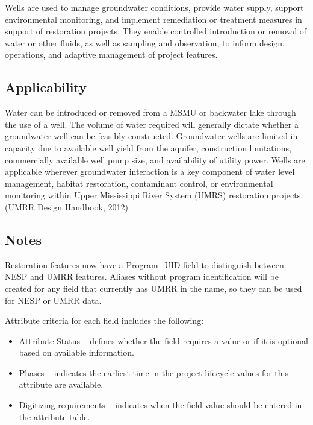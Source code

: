 \documentclass[
  letterpaper,
  DIV=11,
  numbers=noendperiod]{scrreprt}
\providecommand{\tightlist}{%
  \setlength{\itemsep}{0pt}\setlength{\parskip}{0pt}}
\begin{document}
Wells are used to manage groundwater conditions, provide water supply,
support environmental monitoring, and implement remediation or treatment
measures in support of restoration projects. They enable controlled
introduction or removal of water or other fluids, as well as sampling
and observation, to inform design, operations, and adaptive management
of project features.

\subsection{Applicability}\label{applicability-15}

Water can be introduced or removed from a MSMU or backwater lake through
the use of a well. The volume of water required will generally dictate
whether a groundwater well can be feasibly constructed. Groundwater
wells are limited in capacity due to available well yield from the
aquifer, construction limitations, commercially available well pump
size, and availability of utility power. Wells are applicable wherever
groundwater interaction is a key component of water level management,
habitat restoration, contaminant control, or environmental monitoring
within Upper Mississippi River System (UMRS) restoration projects. (UMRR
Design Handbook, 2012)

\subsection{Notes}\label{notes-17}

Restoration features now have a Program\_UID field to distinguish
between NESP and UMRR features. Aliases without program identification
will be created for any field that currently has UMRR in the name, so
they can be used for NESP or UMRR data.

Attribute criteria for each field includes the following:

\begin{itemize}
\tightlist
\item
  Attribute Status -- defines whether the field requires a value or if
  it is optional based on available information.
\item
  Phases -- indicates the earliest time in the project lifecycle values
  for this attribute are available.
\item
  Digitizing requirements -- indicates when the field value should be
  entered in the attribute table.
\end{itemize}
\end{document}
